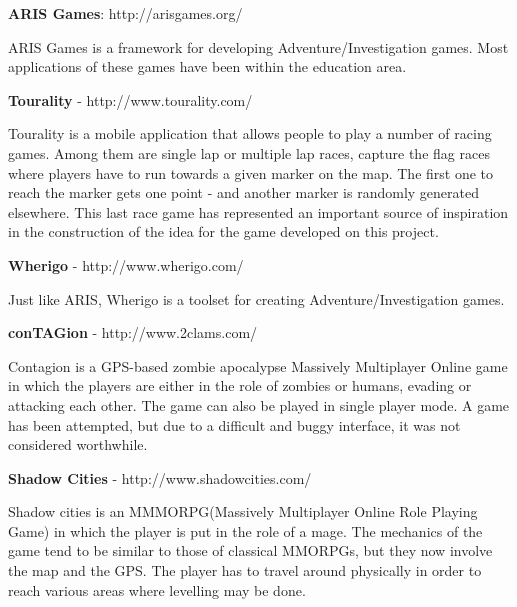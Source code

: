 


\nocite{teamtags}
\nocite{gps1}



\textbf{ARIS Games}: http://arisgames.org/\newline

ARIS Games is a framework for developing Adventure/Investigation games. Most
applications of these games have been within the education area.\newline

\textbf{Tourality} - http://www.tourality.com/\newline

Tourality is a mobile application that allows people to play a number of racing
games. Among them are single lap or multiple lap races, capture the flag races
where players have to run towards a given marker on the map. The first one to
reach the marker gets one point - and another marker is randomly generated
elsewhere. This last race game has represented an important source of
inspiration in the construction of the idea for the game developed on this
project.\newline

\textbf{Wherigo} - http://www.wherigo.com/\newline

Just like ARIS, Wherigo is a toolset for creating Adventure/Investigation games.
\newline

\textbf{conTAGion} - http://www.2clams.com/\newline

Contagion is a GPS-based zombie apocalypse Massively Multiplayer Online game in
which the players are either in the role of zombies or humans, evading or
attacking each other. The game can also be played in single player mode. A game
has been attempted, but due to a difficult and buggy interface, it was
not considered worthwhile.\newline

\textbf{Shadow Cities} - http://www.shadowcities.com/\newline
 
Shadow cities is an MMMORPG(Massively Multiplayer Online Role Playing Game) in
which the player is put in the role of a mage. The mechanics of the game tend to
be similar to those of classical MMORPGs, but they now involve the map and the
GPS. The player has to travel around physically in order to reach various areas
where levelling may be done.\newline

